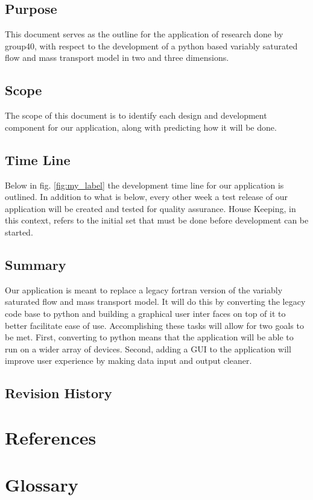 \documentclass[onecolumn, draftclsnofoot,10pt, compsoc]{IEEEtran}
\begin{document}
\subsection{Purpose}
This document serves as the outline for the application of research done by group40, with respect to the development of a python based variably saturated flow and mass transport model in two and three dimensions. 
\subsection{Scope}
The scope of this document is to identify each design and development component for our application, along with predicting how it will be done.  
\subsection{Time Line}
Below in fig. \ref{fig:my_label} the development time line for our application is outlined. In addition to what is below, every other week a test release of our application will be created and tested for quality assurance. House Keeping, in this context, refers to the initial set that must be done before development can be started. 

\subsection{Summary}
Our application is meant to replace a legacy fortran version of the variably saturated flow and mass transport model. It will do this by converting the legacy code base to python and building a graphical user inter faces on top of it to better facilitate ease of use. Accomplishing these tasks will allow for two goals to be met. First, converting to python means that the application will be able to run on a wider array of devices. Second, adding a GUI to the application will improve user experience by making data input and output cleaner.
\subsection{Revision History}
\section{References}

\section{Glossary}
\end{document}
